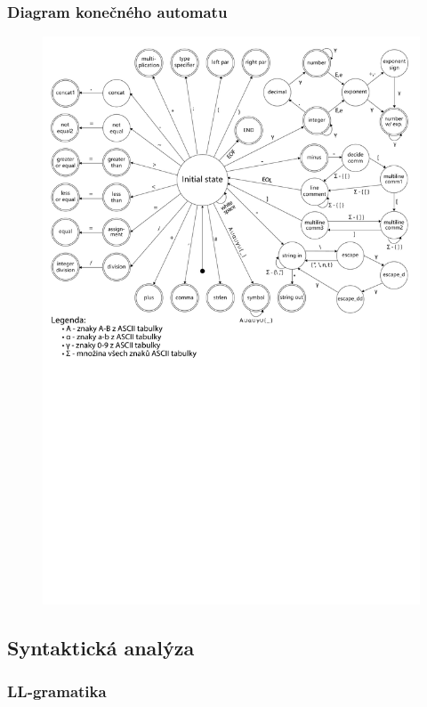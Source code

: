 \documentclass[11pt,a4paper]{article}
\begin{document}
        \subsubsection{Diagram konečného automatu}
        \begin{figure}               
            \includegraphics[width=\linewidth]{images/FSM_v7.pdf}
        \vspace{-60pt}
        \end{figure}
    \subsection{Syntaktická analýza}
        \subsubsection{LL-gramatika}
\end{document}
